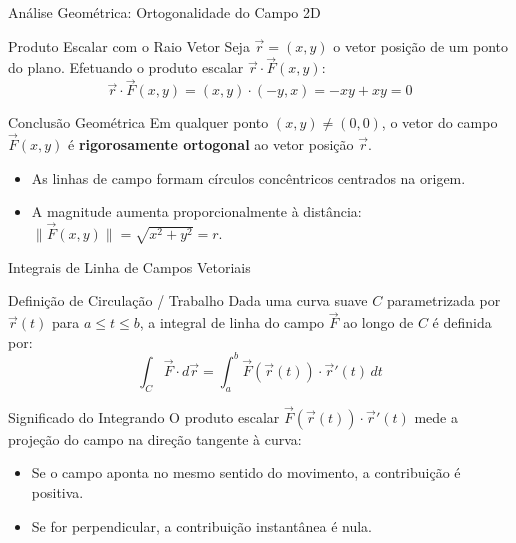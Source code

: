 \documentclass[aspectratio=169, 13pt]{beamer}
\begin{document}
	\begin{frame}{Análise Geométrica: Ortogonalidade do Campo 2D}
		\begin{block}{Produto Escalar com o Raio Vetor}
			Seja $\vec{r} = (x,y)$ o vetor posição de um ponto do plano. Efetuando o produto escalar $\vec{r} \cdot \vec{F}(x,y)$:
			$$\vec{r} \cdot \vec{F}(x,y) = (x, y) \cdot (-y, x) = -xy + xy = 0$$
		\end{block}
		
		\vspace{0.2cm}
		\begin{alertblock}{Conclusão Geométrica}
			Em qualquer ponto $(x,y) \neq (0,0)$, o vetor do campo $\vec{F}(x,y)$ é \textbf{rigorosamente ortogonal} ao vetor posição $\vec{r}$.
			\begin{itemize}
				\item As linhas de campo formam círculos concêntricos centrados na origem.
				\item A magnitude aumenta proporcionalmente à distância: $\|\vec{F}(x,y)\| = \sqrt{x^2+y^2} = r$.
			\end{itemize}
		\end{alertblock}
	\end{frame}
	
	\begin{frame}{Integrais de Linha de Campos Vetoriais}
		\begin{block}{Definição de Circulação / Trabalho}
			Dada uma curva suave $C$ parametrizada por $\vec{r}(t)$ para $a \le t \le b$, a integral de linha do campo $\vec{F}$ ao longo de $C$ é definida por:
			$$\int_C \vec{F} \cdot d\vec{r} = \int_{a}^{b} \vec{F}(\vec{r}(t)) \cdot \vec{r}'(t) \, dt$$
		\end{block}
		
		\vspace{0.2cm}
		\begin{exampleblock}{Significado do Integrando}
			O produto escalar $\vec{F}(\vec{r}(t)) \cdot \vec{r}'(t)$ mede a projeção do campo na direção tangente à curva:
			\begin{itemize}
				\item Se o campo aponta no mesmo sentido do movimento, a contribuição é positiva.
				\item Se for perpendicular, a contribuição instantânea é nula.
			\end{itemize}
		\end{exampleblock}
	\end{frame}
	
\end{document}
